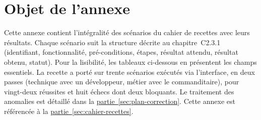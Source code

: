 \label{chap:annexe-recette-complet}
\section*{Objet de l'annexe}
Cette annexe contient l'intégralité des scénarios du cahier de recettes avec leurs résultats. Chaque scénario suit la structure décrite au chapitre~C2.3.1 (identifiant, fonctionnalité, pré-conditions, étapes, résultat attendu, résultat obtenu, statut). Pour la lisibilité, les tableaux ci-dessous en présentent les champs essentiels. La recette a porté sur trente scénarios exécutés via l'interface, en deux passes (technique avec un développeur, métier avec le commanditaire), pour vingt-deux réussites et huit échecs dont deux bloquants. Le traitement des anomalies est détaillé dans la \hyperref[sec:plan-correction]{partie~\ref*{sec:plan-correction}}. Cette annexe est référencée à la \hyperref[sec:cahier-recettes]{partie~\ref*{sec:cahier-recettes}}.


